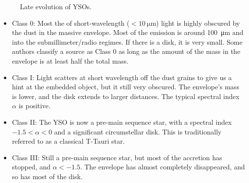 \begin{figure}
\begin{center}

 \par\medskip
{}
\caption[Late evolution of YSOs]{Late evolution of YSOs.}
\label{fig:LateStages}
\end{center}
\end{figure}


\begin{itemize}
\item Class 0: Most the of short-wavelength ($<\SI{10}{\micro\meter}$) light is highly obscured by the dust in the massive envelope. Most of the emission is around \SI{100}{\micro\meter} and into the submillimeter/radio regimes. If there is a disk, it is very small. Some authors \citep{Dunham:2010bx} classify a source as Class 0 as long as the amount of the mass in the envelope is at least half the total mass.
\item Class I: Light scatters at short wavelength off the dust grains to give us a hint at the embedded object, but it still very obscured. The envelope's mass is lower, and the disk extends to larger distances. The typical spectral index $\alpha$ is positive.
\item Class II: The YSO is now a pre-main sequence star, with a spectral index $-1.5 < \alpha < 0$ and a significant circumstellar disk. This is traditionally referred to as a classical T-Tauri star.
\item Class III: Still a pre-main sequence star, but most of the accretion has stopped, and $\alpha < -1.5$. The envelope has almost completely disappeared, and so has most of the disk.
\end{itemize}

